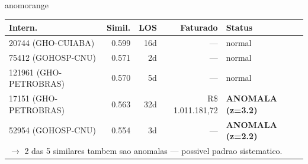 \documentclass[a4paper,10pt]{article}
\begin{document}
\begin{anomalycard}[Internacao 164560 | GHO-PETROBRAS | ALTO (z=4.51)]{anomorange}
\begin{tabular}{l r r r l}\toprule\textbf{Intern.} & \textbf{Simil.} & \textbf{LOS} & \textbf{Faturado} & \textbf{Status} \\\midrule
20744 (GHO-CUIABA) & 0.599 & 16d & --- & \textcolor{jcubeblue}{normal} \\
75412 (GOHOSP-CNU) & 0.571 & 2d & --- & \textcolor{jcubeblue}{normal} \\
121961 (GHO-PETROBRAS) & 0.570 & 5d & --- & \textcolor{jcubeblue}{normal} \\
17151 (GHO-PETROBRAS) & 0.563 & 32d & R\$ 1.011.181,72 & \textcolor{anomred}{\textbf{ANOMALA (z=3.2)}} \\
52954 (GOHOSP-CNU) & 0.554 & 3d & --- & \textcolor{anomred}{\textbf{ANOMALA (z=2.2)}} \\
\multicolumn{5}{l}{\textcolor{anomred}{\small $\rightarrow$ 2 das 5 similares tambem sao anomalas --- possivel padrao sistematico.}} \\
\bottomrule\end{tabular}



\end{anomalycard}

\newpage
\end{document}

